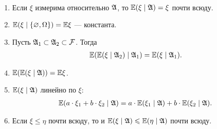\documentclass[../main.tex]{subfiles}
\begin{document}
 \begin{prop}\
  \begin{enumerate}
   \item \label{umo_property_1} Если $ \xi $ измерима относительно $ \mathfrak A $, то $ \mathbb E(\xi \mid \mathfrak A) = \xi $ почти всюду.
   \item \label{umo_property_2} $ \mathbb E(\xi\mid \left\{ \varnothing,\Omega \right\}) = \mathbb E \xi $ --- константа.
   \item \label{umo_property_3} Пусть $ \mathfrak A_1 \subset \mathfrak A_2 \subset \mathcal F $. Тогда
    \begin{align*}
     \mathbb E(\mathbb E(\xi \mid \mathfrak A_2) \mid \mathfrak A_1) = \mathbb E(\xi \mid \mathfrak A_1).
    \end{align*}
   \item \label{umo_property_4} $ \mathbb E(\mathbb E(\xi \mid \mathfrak A)) = \mathbb E \xi $.
   \item \label{umo_property_5} $ \mathbb E(\xi \mid \mathfrak A) $ линейно по $ \xi $:
    \begin{align*}
     \mathbb E(a \cdot \xi_1 + b \cdot \xi_2 \mid \mathfrak A) = a \cdot\mathbb E(\xi_1 \mid \mathfrak A) + b\cdot\mathbb E(\xi_2 \mid \mathfrak A).
    \end{align*}
   \item \label{umo_property_6} Если $ \xi \leqslant \eta $ почти всюду, то и $ \mathbb E(\xi \mid \mathfrak A) \leqslant \mathbb E(\eta \mid \mathfrak A) $ почти всюду.
  \end{enumerate}
 \end{prop}
\end{document}
